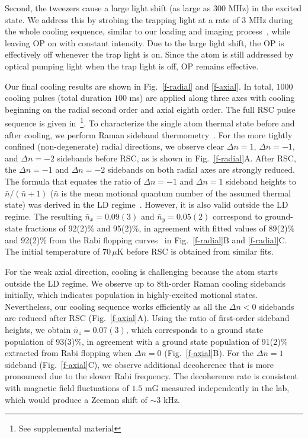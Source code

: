 \documentclass[aps,prl,twocolumn,groupedaddress]{revtex4-1}
\begin{document}
Second, the tweezers cause a large light shift (as large as $300$ MHz) in the excited state.
We address this by strobing the trapping light at a rate of 3 MHz
during the whole cooling sequence,
similar to our loading and imaging process~\cite{Hutzler2017-LightShifts},
while leaving OP on with constant intensity.
Due to the large light shift, the OP is effectively off whenever the trap light is on.
Since the atom is still addressed by optical pumping light when the trap light is off,
OP remains effective.

Our final cooling results are shown in Fig.~\ref{f-radial} and \ref{f-axial}.
In total, $1000$ cooling pulses (total duration $100$ ms) are applied
along three axes with cooling beginning on the radial second order and axial eighth order.
The full RSC pulse sequence is given in~\footnote{See supplemental material}.
To characterize the single atom thermal state before and after cooling,
we perform Raman sideband thermometry~\cite{Monroe1995, Meekhof1996}.
For the more tightly confined (non-degenerate) radial directions,
we observe clear $\Delta n=1$, $\Delta n=-1$, and $\Delta n=-2$ sidebands before RSC,
as is shown in Fig.~\ref{f-radial}A.
After RSC, the $\Delta n=-1$ and $\Delta n=-2$ sidebands on both radial axes are strongly reduced.
The formula that equates the ratio of $\Delta n=-1$ and $\Delta n=1$ sideband heights to
$\bar{n}/(\bar{n}+1)$ ($\bar{n}$ is the mean motional quantum number of the assumed thermal state)
was derived in the LD regime~\cite{Monroe1995}.
However, it is also valid outside the LD regime.
The resulting $\bar{n}_x=0.09(3)$ and $\bar{n}_y=0.05(2)$ correspond to
ground-state fractions of 92(2)\% and 95(2)\%,
in agreement with fitted values of 89(2)\% and 92(2)\%
from the Rabi flopping curves~\cite{Meekhof1996} in Fig.~\ref{f-radial}B and \ref{f-radial}C.
The initial temperature of $70\,\mu$K before RSC is obtained from similar fits.

For the weak axial direction, cooling is challenging because the atom starts outside the LD regime.
We observe up to 8th-order Raman cooling sidebands initially,
which indicates population in highly-excited motional states.
Nevertheless, our cooling sequence works efficiently as all the $\Delta n<0$ sidebands are reduced
after RSC (Fig.~\ref{f-axial}A).
Using the ratio of first-order sideband heights, we obtain $\bar{n}_z=0.07(3)$,
which corresponds to a ground state population of
93(3)\%, in agreement with a ground state population of 91(2)\% extracted from Rabi flopping
when $\Delta n=0$ (Fig.~\ref{f-axial}B).
For the $\Delta n=1$ sideband (Fig.~\ref{f-axial}C),
we observe additional decoherence that is more pronounced due to the slower Rabi frequency.
The decoherence rate is consistent with magnetic field fluctuations of $1.5$ mG
measured independently in the lab, which would produce a Zeeman shift of $\sim 3$ kHz.
\end{document}
